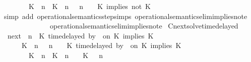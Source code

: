 \begin{isabellebody}
\ \ \ \ \ \ \ \ {\isacharparenleft}{\isacharparenleft}K\ {\isasymUp}\ n{\isacharparenright}\ {\isacharhash}\ {\isacharparenleft}K\ {\isasymnot}{\isasymUp}\ n{\isacharparenright}\ {\isacharhash}\ {\isasymGamma}{\isacharparenright}{\isacharcomma}\ n\ {\isasymturnstile}\ {\isasymPsi}\ {\isasymtriangleright}\ {\isacharparenleft}{\isacharparenleft}K\ implies\ not\ K\ {\isacharhash}\ {\isasymPhi}{\isacharparenright}\ {\isacharbraceright}{\isacartoucheclose}\isanewline
%
\isadelimproof
%
\endisadelimproof
%
\isatagproof
{}\isamarkupfalse%
\ {\isacharparenleft}simp\ add{\isacharcolon}\ operational{\isacharunderscore}semantics{\isacharunderscore}step{\isachardot}simps\ operational{\isacharunderscore}semantics{\isacharunderscore}elim{\isachardot}implies{\isacharunderscore}not{\isacharunderscore}e{}\isanewline
\ \ \ \ \ \ \ \ \ \ \ \ \ \ operational{\isacharunderscore}semantics{\isacharunderscore}elim{\isachardot}implies{\isacharunderscore}not{\isacharunderscore}e{}{\isacharparenright}%
\endisatagproof
{\isafoldproof}%
%
\isadelimproof
\isanewline
%
\endisadelimproof
\isanewline
{}\isamarkupfalse%
\ Cnext{\isacharunderscore}solve{\isacharunderscore}timedelayed{\isacharcolon}\isanewline
\ \ {\isacartoucheopen}{\isacharparenleft}{\isasymC}\isactrlsub n\isactrlsub e\isactrlsub x\isactrlsub t\ {\isacharparenleft}{\isasymGamma}{\isacharcomma}\ n\ {\isasymturnstile}\ {\isacharparenleft}{\isacharparenleft}K\ time{\isacharminus}delayed\ by\ {\isasymdelta}{\isasymtau}\ on\ K\ implies\ K\ {\isacharhash}\ {\isasymPsi}{\isacharparenright}\ {\isasymtriangleright}\ {\isasymPhi}{\isacharparenright}{\isacharparenright}\isanewline
\ \ \ \ {\isasymsupseteq}\ {\isacharbraceleft}\ {\isacharparenleft}{\isacharparenleft}K\ {\isasymnot}{\isasymUp}\ n{\isacharparenright}\ {\isacharhash}\ {\isasymGamma}{\isacharparenright}{\isacharcomma}\ n\ {\isasymturnstile}\ {\isasymPsi}\ {\isasymtriangleright}\ {\isacharparenleft}{\isacharparenleft}K\ time{\isacharminus}delayed\ by\ {\isasymdelta}{\isasymtau}\ on\ K\ implies\ K\ {\isacharhash}\ {\isasymPhi}{\isacharparenright}{\isacharcomma}\isanewline
\ \ \ \ \ \ \ \ {\isacharparenleft}{\isacharparenleft}K\ {\isasymUp}\ n{\isacharparenright}\ {\isacharhash}\ {\isacharparenleft}K\ {\isacharat}\ n\ {\isasymoplus}\ {\isasymdelta}{\isasymtau}\ {\isasymRightarrow}\ K\ {\isacharhash}\ {\isasymGamma}{\isacharparenright}{\isacharcomma}\ n\isanewline

\end{isabellebody}
